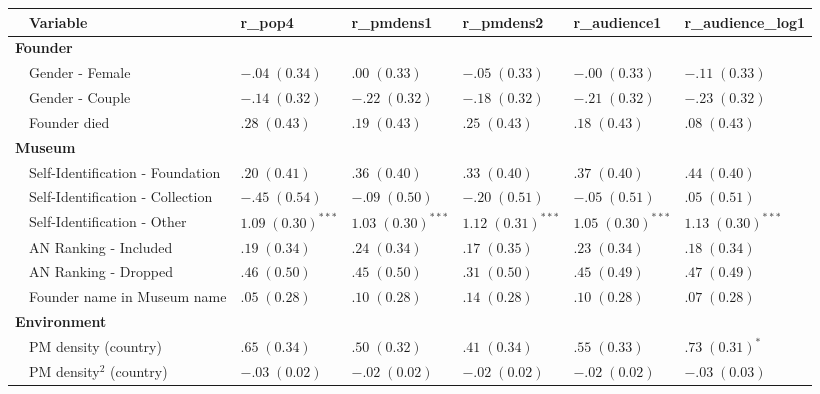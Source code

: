 \documentclass[12pt]{article}
\begin{document}
\begin{landscape}
\begin{table}[ht]
\centering
\begin{tabular}{p{0mm}llllll}
  \hline 
 \multicolumn{1}{l}{} & \multicolumn{1}{l}{Variable} & \multicolumn{1}{l}{r\_pop4} & \multicolumn{1}{l}{r\_pmdens1} & \multicolumn{1}{l}{r\_pmdens2} & \multicolumn{1}{l}{r\_audience1} & \multicolumn{1}{l}{r\_audience\_log1}\\ 
 \hline
  \multicolumn{7}{l}{\textbf{Founder}} \\ 
 & Gender - Female & $-.04 \; (0.34)$ & $.00 \; (0.33)$ & $-.05 \; (0.33)$ & $-.00 \; (0.33)$ & $-.11 \; (0.33)$ \\ 
   & Gender - Couple & $-.14 \; (0.32)$ & $-.22 \; (0.32)$ & $-.18 \; (0.32)$ & $-.21 \; (0.32)$ & $-.23 \; (0.32)$ \\ 
   & Founder died & $.28 \; (0.43)$ & $.19 \; (0.43)$ & $.25 \; (0.43)$ & $.18 \; (0.43)$ & $.08 \; (0.43)$ \\ 
   \multicolumn{7}{l}{\textbf{Museum}} \\ 
 & Self-Identification - Foundation & $.20 \; (0.41)$ & $.36 \; (0.40)$ & $.33 \; (0.40)$ & $.37 \; (0.40)$ & $.44 \; (0.40)$ \\ 
   & Self-Identification - Collection & $-.45 \; (0.54)$ & $-.09 \; (0.50)$ & $-.20 \; (0.51)$ & $-.05 \; (0.51)$ & $.05 \; (0.51)$ \\ 
   & Self-Identification - Other & $1.09 \; (0.30)^{***}$ & $1.03 \; (0.30)^{***}$ & $1.12 \; (0.31)^{***}$ & $1.05 \; (0.30)^{***}$ & $1.13 \; (0.30)^{***}$ \\ 
   & AN Ranking - Included & $.19 \; (0.34)$ & $.24 \; (0.34)$ & $.17 \; (0.35)$ & $.23 \; (0.34)$ & $.18 \; (0.34)$ \\ 
   & AN Ranking - Dropped & $.46 \; (0.50)$ & $.45 \; (0.50)$ & $.31 \; (0.50)$ & $.45 \; (0.49)$ & $.47 \; (0.49)$ \\ 
   & Founder name in Museum name & $.05 \; (0.28)$ & $.10 \; (0.28)$ & $.14 \; (0.28)$ & $.10 \; (0.28)$ & $.07 \; (0.28)$ \\ 
   \multicolumn{7}{l}{\textbf{Environment}} \\ 
 & PM density (country) & $.65 \; (0.34)$ & $.50 \; (0.32)$ & $.41 \; (0.34)$ & $.55 \; (0.33)$ & $.73 \; (0.31)^{*}$ \\ 
   & PM density$^{2}$ (country) & $-.03 \; (0.02)$ & $-.02 \; (0.02)$ & $-.02 \; (0.02)$ & $-.02 \; (0.02)$ & $-.03 \; (0.03)$ \\ 

\end{tabular}
\end{table}
\end{landscape}
\end{document}
